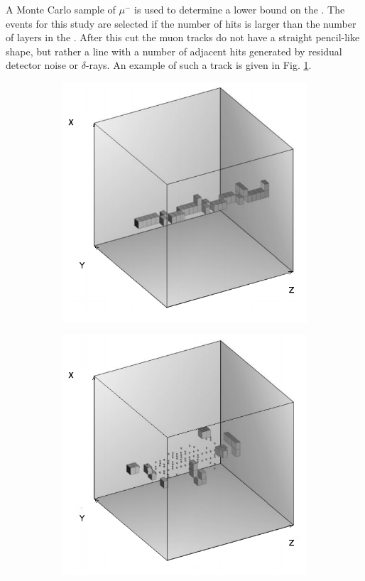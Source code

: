 A Monte Carlo sample of $\mu^-$ is used to determine a lower bound on the \ep. The events for this study are selected if the number of hits is larger than the number of layers in the \ecalp. After this cut the muon tracks do not have a straight pencil-like shape, but rather a line with a number of adjacent hits generated by residual detector noise or $\delta$-rays. An example of such a track is given in Fig. \ref{fig:muonsys}.
\begin{figure}
	\centering
	\begin{subfigure}{0.5\textwidth}
		\centering
		\includegraphics[width=.90\linewidth]{ECAL/graphics/muon-sys.png}
		\caption{\label{fig:muonsys}}
	\end{subfigure}%
	\begin{subfigure}{0.5\textwidth}
		\centering
		\includegraphics[width=.90\linewidth]{ECAL/graphics/e-sys.png}

\end{subfigure}
\end{figure}
